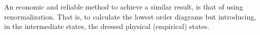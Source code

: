\begin{subappendices}
 An economic and reliable method to achieve a similar result, 
 is that of using renormalization. That is, to calculate the lowest order diagrams 
 but introducing, in the intermediate states, the dressed physical (empirical) states.
 
 
 
 
 
 

\end{subappendices}






























\clearpage
\newpage













\renewcommand{\bibname}{Bibliography Ch 1}
 
% 
 